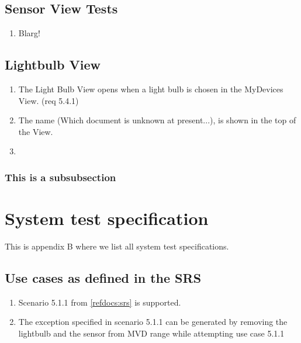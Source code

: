 \documentclass[a4paper]{article}
\begin{document}
\begin{appendices}
\subsection{Sensor View Tests}
\begin{enumerate}[label=\bfseries Test \thesubsection.\arabic*,labelwidth=\widthof{\text{Test 10.10.10}},leftmargin=!]
\item Blarg!
\end{enumerate}

\subsection{Lightbulb View}
\begin{enumerate}[label=\bfseries Test \thesubsection.\arabic*,labelwidth=\widthof{\text{Test 10.10.10}},leftmargin=!]
    \item The Light Bulb View opens when a light bulb is chosen in the MyDevices View. (req 5.4.1)
    \item The name (Which document is unknown at present...), is shown in the top of the View.
    \item
\end{enumerate} 

\subsubsection{This is a subsubsection}

\newpage

\section{System test specification} \label{appendix:section:systemtest}
This is appendix B where we list all system test specifications.

\subsection{Use cases as defined in the SRS}
\begin{enumerate}[label=\bfseries Test \thesubsection.\arabic*,labelwidth=\widthof{\text{Test 10.10.10}},leftmargin=!]
	\item Scenario 5.1.1 from \ref{refdocs:srs} is supported.
	\item The exception specified in scenario 5.1.1 can be generated by removing the lightbulb and the sensor from MVD range while attempting use case 5.1.1
	

\end{enumerate}
\end{appendices}
\end{document}
